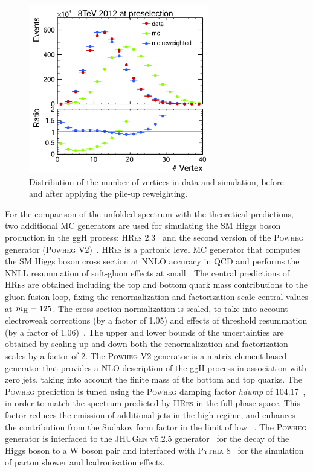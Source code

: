\begin{figure}[htb]
\centering
\includegraphics[width=0.7\textwidth]{images/nvertex.pdf}
\caption{Distribution of the number of vertices in data and simulation, before and after applying the pile-up reweighting.}\label{fig:nvertices}
\end{figure}

For the comparison of the unfolded spectrum with the theoretical predictions, two additional MC generators are used for simulating the SM Higgs boson production in the ggH process: \textsc{HRes} 2.3~\cite{deFlorian:2012mx,Grazzini:2013mca} and the second version of the \textsc{Powheg} generator (\textsc{Powheg V2})~\cite{Bagnaschi:2011tu}.
\textsc{HRes} is a partonic level MC generator that computes the SM Higgs
boson cross section at NNLO accuracy in QCD and performs the NNLL
resummation of soft-gluon effects at small \pt. The central predictions of
\textsc{HRes} are obtained including the top and bottom quark mass contributions to
the gluon fusion loop, fixing the renormalization and factorization scale central values at $m_{\rm H}=125$\GeV. The cross section normalization is scaled, to take into account electroweak corrections (by a factor of 1.05) and effects of threshold resummation (by a factor of 1.06)~\cite{Actis:2008ug,Catani:2003zt}. The upper and lower bounds of the uncertainties are obtained by scaling up and down both the renormalization and factorization scales by a factor of 2.
The \textsc{Powheg V2} generator is a matrix element based generator that provides a NLO description of the ggH process in association with zero jets, taking into account the finite mass of the bottom and top quarks.
The \textsc{Powheg} prediction is tuned using the \textsc{Powheg} damping factor \textit{hdump} of 104.17~\GeV, in order to match the \pth{} spectrum predicted by \textsc{HRes} in the full phase space. This factor reduces the emission of additional jets in the high \pt regime, and enhances the contribution from the Sudakov form factor in the limit of low \pt~\cite{Bagnaschi:2011tu}.
The \textsc{Powheg} generator is interfaced to the \textsc{JHUGen} v5.2.5 generator~\cite{Gao:2010qx,Bolognesi:2012mm,Anderson:2013afp} for the decay of the Higgs boson to a W boson pair and interfaced with \textsc{Pythia 8}~\cite{Sjostrand:2007gs} for the simulation of parton shower and hadronization effects.
